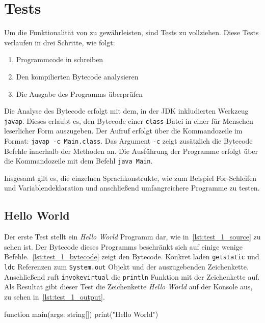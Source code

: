 \chapter{Tests}
\label{cha:tests}

Um die Funktionalität von \toya zu gewährleisten, sind Tests zu vollziehen. Diese Tests verlaufen in drei Schritte, wie folgt:
\begin{enumerate}
    \item Programmcode in \toya schreiben
    \item Den kompilierten Bytecode analysieren
    \item Die Ausgabe des Programms überprüfen
\end{enumerate}

Die Analyse des Bytecode erfolgt mit dem, in der JDK inkludierten Werkzeug \texttt{javap}. Dieses erlaubt es, den Bytecode einer \texttt{class}-Datei in einer für Menschen leserlicher Form auszugeben. Der Aufruf erfolgt über die Kommandozeile im Format: \texttt{javap -c Main.class}. Das Argument \texttt{-c} zeigt zusätzlich die Bytecode Befehle innerhalb der Methoden an. Die Ausführung der Programme erfolgt über die Kommandozeile mit dem Befehl \texttt{java Main}.

Insgesamt gilt es, die einzelnen Sprachkonstrukte, wie zum Beispiel For-Schleifen und Variablendeklaration und anschließend umfangreichere Programme zu testen.

\section{Hello World}

Der erste Test stellt ein \textit{Hello World} Programm dar, wie in~\autoref{lst:test_1_source} zu sehen ist. Der Bytecode dieses Programms beschränkt sich auf einige wenige Befehle.~\autoref{lst:test_1_bytecode} zeigt den Bytecode. Konkret laden \texttt{getstatic} und \texttt{ldc} Referenzen zum \texttt{System.out} Objekt und der auszugebenden Zeichenkette. Anschließend ruft \texttt{invokevirtual} die \texttt{println} Funktion mit der Zeichenkette auf. Als Resultat gibt dieser Test die Zeichenkette \textit{Hello World} auf der Konsole aus, zu sehen in~\autoref{lst:test_1_output}.

\begin{ToyaCode}[numbers=none, caption={Quelltext des Hello World Programms},label=lst:test_1_source]
function main(args: string[]) {
    print("Hello World")
}
\end{ToyaCode}


